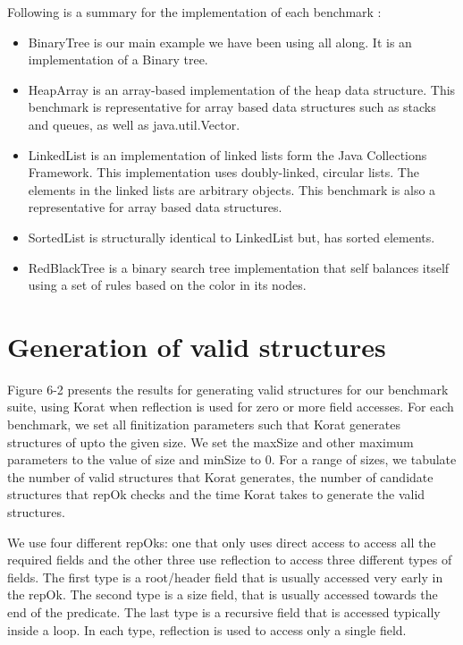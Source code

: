 \par
Following is a summary for the implementation of each benchmark : 
\begin{itemize}
\item BinaryTree is our main example we have been using all along. It is an implementation of a Binary tree.
\item HeapArray is an array-based implementation of the heap data structure. This benchmark is representative for array based data structures such as stacks and queues, as well as java.util.Vector.
\item LinkedList is an implementation of linked lists form the Java Collections Framework. This implementation uses doubly-linked, circular lists. The elements in the linked lists are arbitrary objects. This benchmark is also a representative for array based data structures.
\item SortedList is structurally identical to LinkedList but, has sorted elements.
\item RedBlackTree is a binary search tree implementation that self balances itself using a set of rules based on the color in its nodes.
\end{itemize}

\section{Generation of valid structures}
Figure 6-2 presents the results for generating valid structures for our benchmark suite, using Korat when reflection is used for zero or more field accesses. For each benchmark, we set all finitization parameters such that Korat generates structures of upto the given size. We set the maxSize and other maximum parameters to the value of size and minSize to 0. For a range of sizes, we tabulate the number of valid structures that Korat generates, the number of candidate structures that repOk checks and the time Korat takes to generate the valid structures. 

\par
We use four different repOks: one that only uses direct access to access all the required fields and the other three use reflection to access three different types of fields. The first type is a root/header field that is usually accessed very early in the repOk. The second type is a size field, that is usually accessed towards the end of the predicate. The last type is a recursive field that is accessed typically inside a loop. In each type, reflection is used to access only a single field. 

